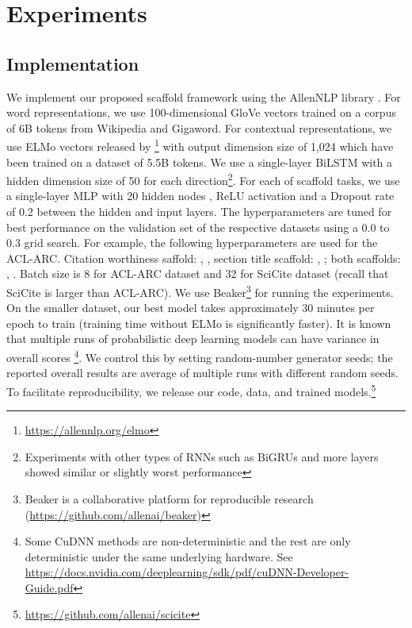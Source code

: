 \documentclass[11pt,a4paper]{article}
\newcommand{\acldata}{ACL-ARC\xspace}
\newcommand{\ourdata}{SciCite\xspace}
\begin{document}
\section{Experiments}
\label{sec:experiments}


\subsection{Implementation}

We implement our proposed scaffold framework using the AllenNLP library \cite{Gardner2017AllenNLP}. For word representations, we use 100-dimensional GloVe vectors \cite{pennington2014glove} trained on a corpus of 6B tokens from Wikipedia and Gigaword. For contextual representations, we use ELMo vectors released by \citet{Peters2018DeepCW}\footnote{\url{https://allennlp.org/elmo}} with output dimension size of 1,024 which have been trained on a dataset of 5.5B tokens. We use a single-layer BiLSTM with a hidden dimension size of 50 for each direction\footnote{Experiments with other types of RNNs such as BiGRUs and more layers showed similar or slightly worst performance}. For each of scaffold tasks, we use a single-layer MLP with 20 hidden nodes , ReLU \cite{nair2010rectified} activation and a Dropout rate \cite{srivastava2014dropout} of 0.2 between the hidden and input layers.
The hyperparameters  are tuned for best performance on the validation set of the respective datasets using a 0.0 to 0.3 grid search. For example, the following hyperparameters are used for the ACL-ARC. Citation worthiness saffold: , , section title scaffold: , ; both scaffolds: , . Batch size is 8 for \acldata dataset and 32 for \ourdata dataset (recall that \ourdata is larger than \acldata). We use Beaker\footnote{Beaker is a collaborative platform for reproducible research (\url{https://github.com/allenai/beaker})} for running the experiments. On the smaller dataset, our best model takes approximately 30 minutes per epoch to train (training time without ELMo is significantly faster).
It is known that multiple runs of probabilistic deep learning models can have variance in overall scores \cite{Reimers2017ReportingSD}\footnote{Some CuDNN methods are non-deterministic and the rest are only deterministic under the same underlying hardware. See \url{https://docs.nvidia.com/deeplearning/sdk/pdf/cuDNN-Developer-Guide.pdf}}. We control this by setting random-number generator seeds; the reported overall results are average of multiple runs with different random seeds.
To facilitate reproducibility, we release our code, data, and trained models.\footnote{\url{https://github.com/allenai/scicite}}
\end{document}
